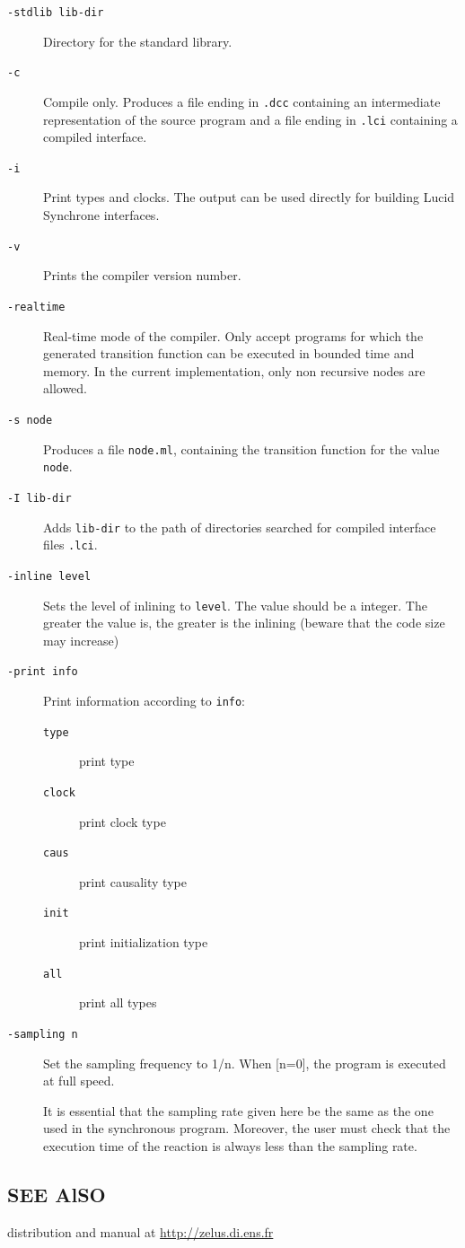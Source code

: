 \documentclass[11pt,titlepage,twoside]{report}
\begin{document}
\begin{description}
\item[\tt -stdlib lib-dir]
Directory for the standard library.
\item[\tt -c]
Compile only. Produces a file ending in \verb-.dcc- containing an
intermediate representation of the source program and a 
file ending in \verb-.lci- containing a compiled interface.
\item[\tt -i] 
Print types and clocks. The output can be used directly for building
Lucid Synchrone interfaces.
\item[\tt -v]
Prints the compiler version number.
\item[\tt -realtime]
Real-time mode of the compiler. Only accept programs for which the
generated transition function can be executed in bounded time and
memory. In the current implementation, only non recursive nodes are
allowed. 
\item[\tt -s node]
Produces a file \verb-node.ml-, 
containing the transition function for the value
\verb-node-.
\item[\tt -I lib-dir]
Adds \verb+lib-dir+ 
to the path of directories searched for compiled interface files \verb-.lci-.
\item[\tt -inline level]
Sets the level of inlining to
\verb-level-.
The value should be a integer. The greater the value is, the greater is
the inlining (beware that the code size may increase)
\item[\tt -print info]
Print information according to \verb-info-:
\begin{description}
\item[\tt type] print type
\item[\tt clock] print clock type
\item[\tt caus] print causality type
\item[\tt init] print initialization type
\item[\tt all] print all types
\end{description}
\item[\tt -sampling n]
Set the sampling frequency to 1/n. When [n=0], the program is
executed at full speed.

It is essential that the sampling rate given here be the same as the
one used in the synchronous program. Moreover, the
user must check that the execution time of the reaction is always less
than the sampling rate.
\end{description}

\subsection*{SEE AlSO}
distribution and manual at \url{http://zelus.di.ens.fr}
\end{document}
